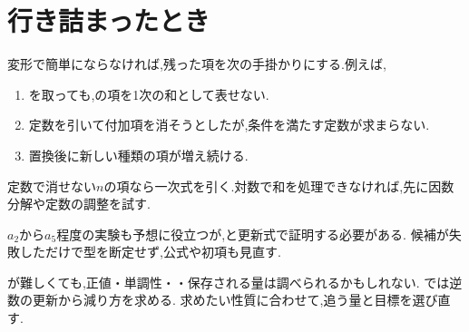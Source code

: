  \section{行き詰まったとき}\label{節：解法の変更}

  変形で簡単にならなければ,残った項を次の手掛かりにする.例えば,
  \begin{enumerate}
    \item {}を取っても,の項を1次の和として表せない.
    \item 定数を引いて付加項を消そうとしたが,条件を満たす定数が求まらない.
    \item 置換後に新しい種類の項が増え続ける.
  \end{enumerate}
  定数で消せない$n$の項なら一次式を引く.対数で和を処理できなければ,先に因数分解や定数の調整を試す.
  \BookFigFallback

  $a_2$から$a_5$程度の実験も予想に役立つが,と更新式で証明する必要がある.
  候補が失敗しただけで型を断定せず,公式や初項も見直す.

  が難しくても,正値・単調性・・保存される量は調べられるかもしれない.
  では逆数の更新から減り方を求める.
  求めたい性質に合わせて,追う量と目標を選び直す.
